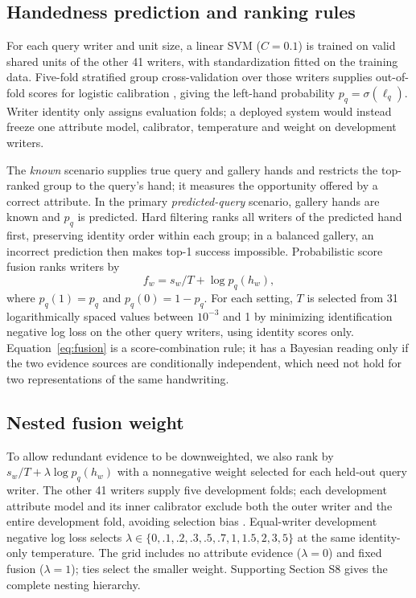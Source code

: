 \documentclass[ASNA,twocolumn]{USG}
\begin{document}
\subsection{Handedness prediction and ranking rules}
\label{sec:rules}
For each query writer and unit size, a linear SVM ($C=0.1$) is trained on valid shared units of the other 41 writers, with standardization fitted on the training data. Five-fold stratified group cross-validation over those writers supplies out-of-fold scores for logistic calibration \cite{platt1999probabilistic}, giving the left-hand probability $p_q=\sigma(\ell_q)$. Writer identity only assigns evaluation folds; a deployed system would instead freeze one attribute model, calibrator, temperature and weight on development writers.

The \emph{known} scenario supplies true query and gallery hands and restricts the top-ranked group to the query's hand; it measures the opportunity offered by a correct attribute. In the primary \emph{predicted-query} scenario, gallery hands are known and $p_q$ is predicted. Hard filtering ranks all writers of the predicted hand first, preserving identity order within each group; in a balanced gallery, an incorrect prediction then makes top-1 success impossible. Probabilistic score fusion ranks writers by
\begin{equation}
 f_w=s_w/T+\log p_q(h_w),
 \label{eq:fusion}
\end{equation}
where $p_q(1)=p_q$ and $p_q(0)=1-p_q$. For each setting, $T$ is selected from 31 logarithmically spaced values between $10^{-3}$ and 1 by minimizing identification negative log loss on the other query writers, using identity scores only. Equation~\eqref{eq:fusion} is a score-combination rule; it has a Bayesian reading only if the two evidence sources are conditionally independent, which need not hold for two representations of the same handwriting.

\subsection{Nested fusion weight}
\label{sec:nested}
To allow redundant evidence to be downweighted, we also rank by $s_w/T+\lambda\log p_q(h_w)$ with a nonnegative weight selected for each held-out query writer. The other 41 writers supply five development folds; each development attribute model and its inner calibrator exclude both the outer writer and the entire development fold, avoiding selection bias \cite{cawley2010selection}. Equal-writer development negative log loss selects $\lambda\in\{0,.1,.2,.3,.5,.7,1,1.5,2,3,5\}$ at the same identity-only temperature. The grid includes no attribute evidence ($\lambda=0$) and fixed fusion ($\lambda=1$); ties select the smaller weight. Supporting Section S8 gives the complete nesting hierarchy.
\end{document}
